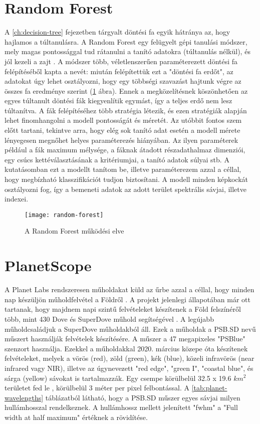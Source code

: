 \section{Random Forest}

A \ref{ch:decision-tree} fejezetben tárgyalt döntési fa egyik hátránya az, hogy hajlamos a túltanulásra. A Random Forest egy felügyelt gépi tanulási módszer, mely magas pontossággal tud rátanulni a tanító adatokra (túltanulás nélkül), és jól kezeli a zajt \cite{breiman2001}. A módszer több, véletlenszerűen paraméterezett döntési fa felépítéséből kapta a nevét: miután felépítettük ezt a "döntési fa erdőt", az adatokat úgy lehet osztályozni, hogy egy többségi szavazást hajtunk végre az összes fa eredménye szerint (\ref{fig:random-forest} ábra). Ennek a megközelítésnek köszönhetően az egyes túltanult döntési fák kiegyenlítik egymást, így a teljes erdő nem lesz túltanítva. A fák felépítéséhez több stratégia létezik, és ezen stratégiák alapján lehet finomhangolni a modell pontosságát és méretét. Az utóbbit fontos szem előtt tartani, tekintve arra, hogy elég sok tanító adat esetén a modell mérete lényegesen megnőhet helyes paraméterezés hiányában. Az ilyen paraméterek például a fák maximum mélysége, a fáknak átadott részadathalmaz dimenziói, egy csúcs kettéválasztásának a kritériumjai, a tanító adatok súlyai stb. A kutatásomban ezt a modellt tanítom be, illetve paraméterezem azzal a céllal, hogy megbízható klasszifikációt tudjon biztosítani. A modell minden képkockát osztályozni fog, így a bemeneti adatok az adott terület spektrális sávjai, illetve indexei. 

\begin{figure}[H]
	\centering
	\texttt{[image: random-forest]}
	\caption{A Random Forest működési elve \cite{IBM2024}}
    \label{fig:random-forest}
\end{figure}

\section{PlanetScope}

A Planet Labs rendszeresen műholdakat küld az űrbe azzal a céllal, hogy minden nap készüljön műholdfelvétel a Földről \cite{planetgoal2024}. A projekt jelenlegi állapotában már ott tartanak, hogy majdnem napi szintű felvételeket készítenek a Föld felszínéről több, mint 430 Dove és SuperDove műhold segítségével \cite{planetmissions2024}. A legújabb műholdcsaládjuk a SuperDove műholdakból áll. Ezek a műholdak a PSB.SD nevű műszert használják felvételek készítésére. A műszer a 47 megapixeles "PSBlue" szenzort használja.  Ezekkel a műholdakkal 2020. március közepe óta készítenek felvételeket, melyek a vörös (red), zöld (green), kék (blue), közeli infravörös (near infrared vagy NIR), illetve az úgynevezett "red edge", "green I", "coastal blue", és sárga (yellow) sávokat is tartalmazzák. Egy csempe körülbelül 32.5 x 19.6 $ km^2 $ területet fed le \cite{planetsensors2024}, körülbelül 3 méter per pixel felbontással. A \ref{tab:planet-wavelengths} táblázatból látható, hogy a PSB.SD műszer egyes sávjai milyen hullámhosszal rendelkeznek. A hullámhossz mellett jelenített "fwhm" a "Full width at half maximum" értéknek a rövidítése.

